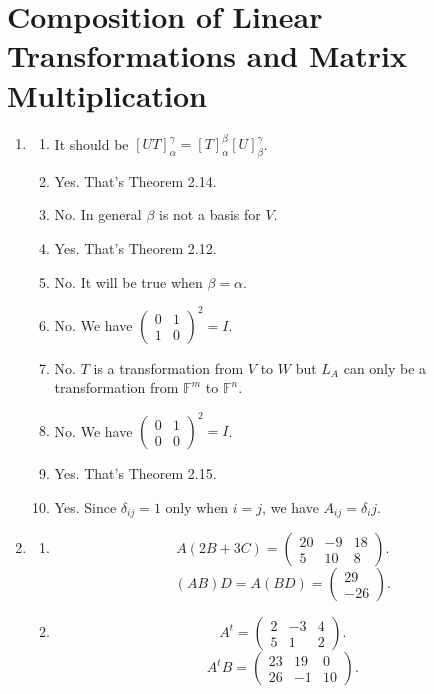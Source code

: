 \section{Composition of Linear Transformations and Matrix Multiplication}
\begin{enumerate}
\item \begin{enumerate}
\item It should be $[UT]_{\alpha }^{\gamma }=[T]_{\alpha }^{\beta }[U]_{\beta }^{\gamma }$.
\item Yes. That's Theorem 2.14.
\item No. In general $\beta $ is not a basis for $V$.
\item Yes. That's Theorem 2.12.
\item No. It will be true when $\beta =\alpha $.
\item No. We have $\left(\begin{array}{cc}0&1\\1&0\end{array}\right) ^2=I$.
\item No. $T$ is a transformation from $V$ to $W$ but $L_A$ can only be a transformation from $\mathbb{F}^m$ to $\mathbb{F}^n$.
\item No. We have $\left(\begin{array}{cc}0&1\\0&0\end{array}\right) ^2=I$.
\item Yes. That's Theorem 2.15.
\item Yes. Since $\delta_{ij}=1$ only when $i=j$, we have $A_{ij}=\delta_ij$.
\end{enumerate}
\item \begin{enumerate}
\item \[A(2B+3C)=\left(\begin{array}{ccc}20&-9&18\\5&10&8\end{array}\right).\]
\[(AB)D=A(BD)=\left(\begin{array}{c}29\\-26\end{array}\right).\]
\item \[A^t=\left(\begin{array}{ccc}2&-3&4\\5&1&2\end{array}\right).\]
\[A^tB=\left(\begin{array}{ccc}23&19&0\\26&-1&10\end{array}\right).\]

\end{enumerate}
\end{enumerate}
